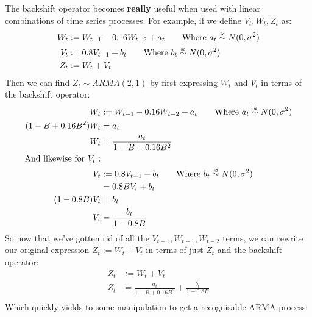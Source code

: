 The backshift operator becomes \textbf{really} useful when used with linear
combinations of time series processes. For example, if we define $V_{t},W_{t},  Z_{t}$ as:
\begin{equation*}
    \begin{aligned}
        W_{t} &:= W_{t-1} - 0.16W_{t-2} + a_{t} \qquad \text{Where $a_t \iid N(0, \sigma^2)$}\\
        V_{t} &:= 0.8V_{t-1} + b_{t} \qquad \text{Where $b_t \iid N(0, \sigma^2)$}\\
        Z_{t} &:= W_{t} + V_{t} \\
    \end{aligned}
\end{equation*}
Then we can find $Z_{t} \sim ARMA(2, 1)$ by first expressing $W_{t}$ and
$V_{t}$ in terms of the backshift operator:
\begin{equation*}
    \begin{aligned}
        W_{t} &:= W_{t-1} - 0.16W_{t-2} + a_{t} \qquad \text{Where $a_t \iid N(0, \sigma^2)$}\\
        (1-B + 0.16B^{2})W_{t} &= a_{t} \\
        W_{t} &= \frac{a_{t}}{1-B + 0.16B^{2}} \\
        \text{And likewise for $V_{t}$ :}&\\
        V_{t} &:= 0.8V_{t-1} + b_{t} \qquad \text{Where $b_t \iid N(0, \sigma^2)$}\\
              &= 0.8BV_{t} + b_{t} \\
        (1-0.8B)V_{t} &= b_{t} \\
        V_{t} &= \frac{b_{t}}{1-0.8B} \\
    \end{aligned}
\end{equation*}
So now that we've gotten rid of all the $V_{t-1}, W_{t-1}, W_{t-2}$ terms, we
can rewrite our original expression $Z_{t} := W_{t} + V_{t}$ in terms of just
$Z_{t}$ and the backshift operator:
\begin{equation*}
    \begin{aligned}
        Z_{t} &:= W_{t} + V_{t} \\
        Z_{t} &= \frac{a_{t}}{1-B + 0.16B^{2}} + \frac{b_{t}}{1-0.8B} \\
    \end{aligned}
\end{equation*}
Which quickly yields to some manipulation to get a recognisable ARMA process:
